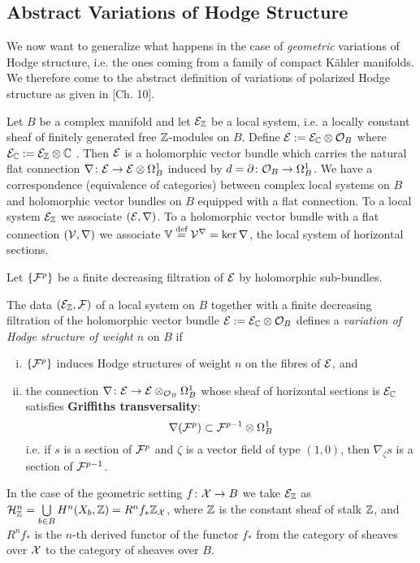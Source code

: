 \documentclass[../main.tex]{subfiles}
\begin{document}
\subsection{Abstract Variations of Hodge Structure} \label{subsecvhs}

We now want to generalize what happens in the case of \emph{geometric} variations of Hodge structure, i.e. the ones coming from a family of compact K\"{a}hler manifolds. 
We therefore come to the abstract definition of variations of polarized Hodge structure as given in \cite{PS08}[Ch. 10].

Let $B$ be a complex manifold and let $\mathcal{E}_{\mathbb{Z}}$ be a local system, i.e. a locally constant sheaf of finitely generated free $\mathbb{Z}$-modules on $B$. Define $\mathcal{E} := \mathcal{E}_{\mathbb{C}} \otimes \mathcal{O}_B$ where $\mathcal{E}_{\mathbb{C}} := \mathcal{E}_{\mathbb{Z}} \otimes \mathbb{C}$ . Then $\mathcal{E}$ is a holomorphic vector bundle which carries the natural flat connection $\nabla\colon \mathcal{E} \to \mathcal{E} \otimes \Omega_B^1$ induced by $d=\partial \colon \mathcal{O}_B \to \Omega_B^1$. 
We have a correspondence (equivalence of categories) between complex local systems on $B$ and holomorphic vector bundles on $B$ equipped with a flat connection. To a local system $\mathcal{E}_{\mathbb{Z}}$ we associate $(\mathcal{E}, \nabla)$. To a holomorphic vector bundle with a flat connection $(\mathcal{V},\nabla)$ we associate $\mathbb{V} \stackrel{\text{def}}{=} \mathcal{V}^\nabla= \ker \nabla $, the local system of horizontal sections. 

Let $\{\mathcal{F}^p\}$ be a finite decreasing filtration of $\mathcal{E}$ by holomorphic sub-bundles.

\begin{defn} \label{defn:VHS} The data $(\mathcal{E}_{\mathbb{Z}},\mathcal{F})$ of a local system on $B$ together with a finite decreasing filtration of  the holomorphic vector bundle $\mathcal{E} := \mathcal{E}_{\mathbb{C}} \otimes \mathcal{O}_B$  defines a \emph{variation of Hodge structure of weight $n$} on $B$ if
\begin{enumerate}[(i)]
\item $\{\mathcal{F}^p\}$ induces Hodge structures of weight $n$ on the fibres of $\mathcal{E}$, and
\item  the connection $\nabla \colon \mathcal{E} \to \mathcal{E} \otimes_{\mathcal{O}_B} \Omega^1_B$ whose sheaf of horizontal sections is $\mathcal{E}_{\mathbb{C}}$ satisfies \textbf{Griffiths transversality}:
\[ \nabla(\mathcal{F}^p) \subset \mathcal{F}^{p-1} \otimes \Omega^1_B
\]
i.e. if $s$ is a section of $\mathcal{F}^p$ and $\zeta$ is a vector field of type $(1,0)$, then $\nabla_{\zeta}s$ is a section of $\mathcal{F}^{p-1}$.
\end{enumerate}
\end{defn}
In the case of the geometric setting $f \colon \mathcal{X} \to B$ we take $\mathcal{E}_{\mathbb{Z}}$ as  $\mathcal{H}_{\mathbb{Z}}^n = \bigcup\limits_{b \in B} H^n(X_b,\mathbb{Z}) = R^nf_*\mathbb{Z}_{\mathcal{X}}$, where $\mathbb{Z}$ is the constant sheaf of stalk $\mathbb{Z}$, and $R^nf_*$ is the $n$-th derived functor of the functor $f_*$ from the category of sheaves over $\mathcal{X}$ to the category of sheaves over $B$.
\end{document}
